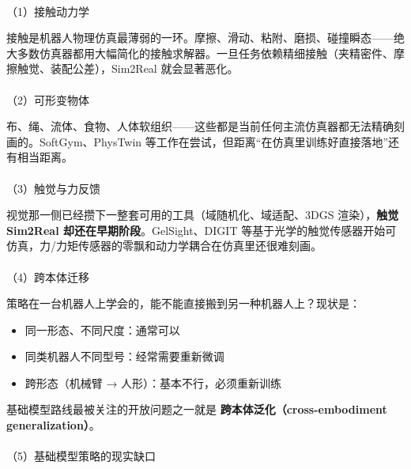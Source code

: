 \documentclass[
  chinese,
]{ctexart}
\makeatletter
\let\oldparagraph\paragraph
\renewcommand{\paragraph}{
    \@ifstar
      \xxxParagraphStar
      \xxxParagraphNoStar
  }
\newcommand{\xxxParagraphStar}[1]{\oldparagraph*{#1}\mbox{}}
\newcommand{\xxxParagraphNoStar}[1]{\oldparagraph{#1}\mbox{}}
\providecommand{\tightlist}{%
  \setlength{\itemsep}{0pt}\setlength{\parskip}{0pt}}
\makeatother
\begin{document}
\paragraph{（1）接触动力学}\label{ux63a5ux89e6ux52a8ux529bux5b66}

接触是机器人物理仿真最薄弱的一环。摩擦、滑动、粘附、磨损、碰撞瞬态------绝大多数仿真器都用大幅简化的接触求解器。一旦任务依赖精细接触（夹精密件、摩擦触觉、装配公差），Sim2Real
就会显著恶化。

\paragraph{（2）可形变物体}\label{ux53efux5f62ux53d8ux7269ux4f53}

布、绳、流体、食物、人体软组织------这些都是当前任何主流仿真器都无法精确刻画的。SoftGym、PhysTwin
等工作在尝试，但距离``在仿真里训练好直接落地''还有相当距离。

\paragraph{（3）触觉与力反馈}\label{ux89e6ux89c9ux4e0eux529bux53cdux9988}

视觉那一侧已经攒下一整套可用的工具（域随机化、域适配、3DGS
渲染），\textbf{触觉 Sim2Real 却还在早期阶段}。GelSight、DIGIT
等基于光学的触觉传感器开始可仿真，力/力矩传感器的零飘和动力学耦合在仿真里还很难刻画。

\paragraph{（4）跨本体迁移}\label{ux8de8ux672cux4f53ux8fc1ux79fb}

策略在一台机器人上学会的，能不能直接搬到另一种机器人上？现状是：

\begin{itemize}
\tightlist
\item
  同一形态、不同尺度：通常可以
\item
  同类机器人不同型号：经常需要重新微调
\item
  跨形态（机械臂 → 人形）：基本不行，必须重新训练
\end{itemize}

基础模型路线最被关注的开放问题之一就是
\textbf{跨本体泛化（cross-embodiment generalization）}。

\paragraph{（5）基础模型策略的现实缺口}\label{ux57faux7840ux6a21ux578bux7b56ux7565ux7684ux73b0ux5b9eux7f3aux53e3}
\end{document}
